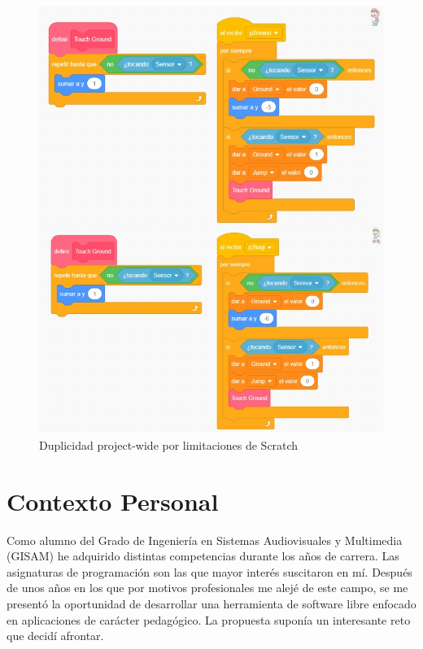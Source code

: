 \documentclass[a4paper, 12pt]{book}
\begin{document}
\begin{figure}[!htb]
	\centering
    \includegraphics[width=13cm, keepaspectratio]{img/duplicate_customblock.jpg}
    \caption{Duplicidad project-wide por limitaciones de Scratch}
    \label{fig:duplicate_customblock}
\end{figure}


\section{Contexto Personal}
\label{sec:contexto}

Como alumno del Grado de Ingeniería en Sistemas Audiovisuales y Multimedia (GISAM) he adquirido distintas competencias durante los años de carrera. Las asignaturas de programación son las que mayor interés suscitaron en mí. Después de unos años en los que por motivos profesionales me alejé de este campo, se me presentó la oportunidad de desarrollar una herramienta de software libre enfocado en aplicaciones de carácter pedagógico. La propuesta suponía un interesante reto que decidí afrontar. 
\end{document}
